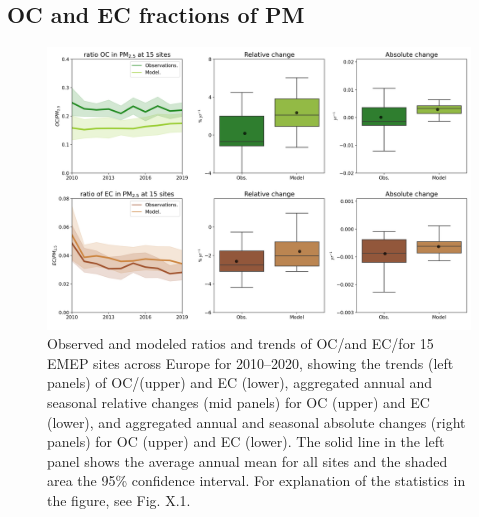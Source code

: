 
\subsection{OC and EC fractions of PM}
\label{ss:OCECfrac}


\begin{figure}
\includegraphics[width=16cm]{FIGS_TRENDS/ECOC_ratio_trends.png}
 \caption{Observed and modeled ratios and trends of OC/\pmfine and EC/\pmfine for
  15 EMEP sites across Europe for 2010--2020, showing the trends
  (left panels) of OC/\pmfine (upper) and EC (lower), aggregated annual and
  seasonal relative changes (mid panels) for OC (upper) and EC (lower),
  and aggregated annual and seasonal absolute changes (right panels)
  for OC (upper) and EC (lower). The solid line in the left panel shows
  the average annual mean for all sites and the shaded area the 95\%
  confidence interval. For explanation of the statistics in the figure,
  see Fig. X.1. \label{fig:KEX3}
 }
\end{figure}

